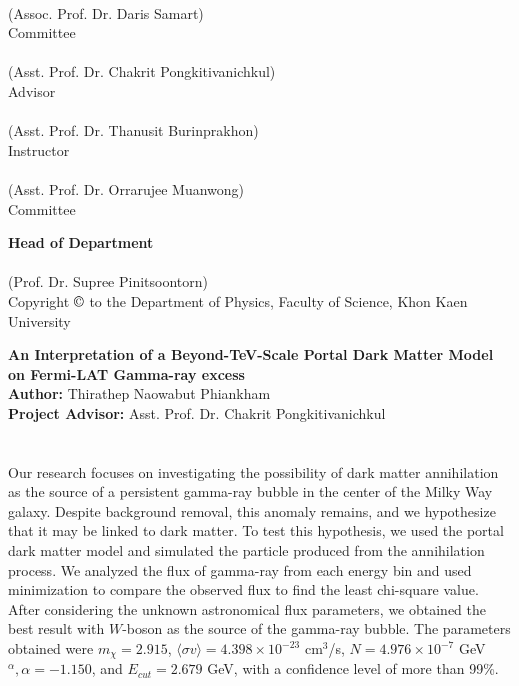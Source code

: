 \documentclass[10pt, oneside]{book}
\numberwithin{equation}{chapter}
\begin{document}
\begin{center}
	\begin{paracol}{2}
		\dotfill \\
		(Assoc. Prof. Dr. Daris Samart) \\
		Committee \\
		\vspace{0.75cm}
		\dotfill \\
		(Asst. Prof. Dr. Chakrit Pongkitivanichkul) \\
		Advisor \\
		\vspace{0.75cm}
		\dotfill \\
		(Asst. Prof. Dr. Thanusit Burinprakhon) \\
		Instructor \\
		\switchcolumn
		\dotfill \\
		(Asst. Prof. Dr. Orrarujee Muanwong) \\
		Committee \\
	\end{paracol}
	\vspace{0.75cm}
	\textbf{Head of Department}\\
	\vspace{0.75cm}
	\makebox[80mm]{\dotfill} \\
	(Prof. Dr. Supree Pinitsoontorn)\\
	\vspace{1cm}
	Copyright $\copyright$ to the Department of Physics, Faculty of Science, Khon Kaen University
\end{center}
\thispagestyle{empty}
\newpage


\noindent\textbf{An Interpretation of a Beyond-TeV-Scale Portal Dark Matter Model on Fermi-LAT Gamma-ray excess}\\
\textbf{Author:} Thirathep Naowabut Phiankham\\
\textbf{Project Advisor:} Asst. Prof. Dr. Chakrit Pongkitivanichkul
\section*{}
Our research focuses on investigating the possibility of dark matter annihilation as the source of a persistent gamma-ray bubble in the center of the Milky Way galaxy. Despite background removal, this anomaly remains, and we hypothesize that it may be linked to dark matter. To test this hypothesis, we used the portal dark matter model and simulated the particle produced from the annihilation process. We analyzed the flux of gamma-ray from each energy bin and used minimization to compare the observed flux to find the least chi-square value. After considering the unknown astronomical flux parameters, we obtained the best result with $W$-boson as the source of the gamma-ray bubble. The parameters obtained were $m_\chi=2.915$, $\langle\sigma v\rangle=4.398\times10^{-23}$ cm$^3$/s, $N=4.976\times10^{-7}$ GeV$^\alpha, \alpha=-1.150$, and $E_{cut}=2.679$ GeV, with a confidence level of more than 99\%.
\end{document}
